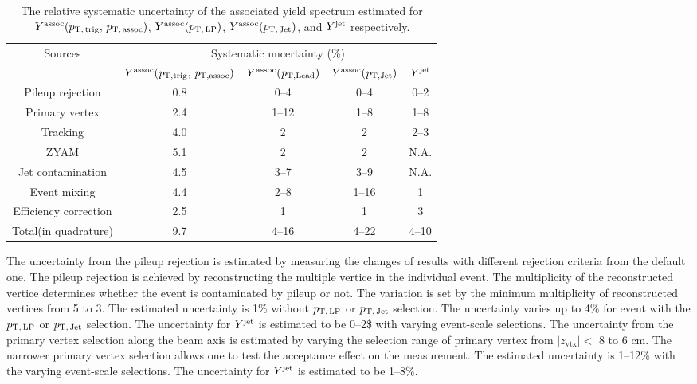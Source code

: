 \begin{table}[h!]
\caption{The relative systematic uncertainty of the associated yield spectrum estimated for $Y^{\rm{assoc}}(p_\mathrm{T,\,trig},\,p_\mathrm{T,\,assoc})$, $Y^{\rm{assoc}}(p_\mathrm{T,\,LP})$, $Y^{\rm{assoc}}(p_\mathrm{T,\,Jet})$, and $Y^{\rm{jet}}$ respectively.}
\centering
\begin{tabular}{|c|c|c|c|c|}
\hline 
\multirow{2}{*}{Sources}  & \multicolumn{4}{c|}{Systematic uncertainty (\%)} \\\cline{2-5} 
         & $Y^{\rm{assoc}}(\it{p}_{\rm{T, trig}},\,\it{p}_{\rm{T, assoc}})$ & $Y^{\rm{assoc}}(\it{p}_{\rm{T, Lead}})$ & $Y^{\rm{assoc}}(\it{p}_{\rm{T, Jet}})$ & $Y^{\rm{jet}}$ \\ \hline \hline
Pileup rejection		& 0.8	&0--4		&0--4	&0--2	\\ \hline
Primary vertex		& 2.4	&1--12	&1--8	&1--8	\\ \hline

Tracking			& 4.0 	&2		&2	&2--3	\\ \hline

ZYAM			& 5.1	&2		&2	&N.A.	\\ \hline
Jet contamination	& 4.5	&3--7		&3--9	&N.A.	\\ \hline

Event mixing			& 4.4	&2--8		&1--16	&1	\\ \hline

Efficiency correction	& 2.5 	&1		&1	&3	\\ \hline \hline
Total(in quadrature)			& 9.7	&4--16	&4--22	&4--10 \\ 
\hline 
\end{tabular}
\label{tab:syst}
\end{table}

The uncertainty from the pileup rejection is estimated by measuring the changes of results with different rejection criteria from the default one. The pileup rejection is achieved by reconstructing the multiple vertice in the individual event. The multiplicity of the reconstructed vertice determines whether the event is contaminated by pileup or not. The variation is set by the minimum multiplicity of reconstructed vertices from 5 to 3. The estimated uncertainty is 1\% without $p_\mathrm{T,\,LP}$ or $p_\mathrm{T,\,Jet}$ selection. The uncertainty varies up to 4\% for event with the $p_\mathrm{T,\,LP}$ or $p_\mathrm{T,\,Jet}$ selection. The uncertainty for $Y^{\rm{jet}}$ is estimated to be 0--2\$ with varying event-scale selections.
The uncertainty from the primary vertex selection along the beam axis is estimated by varying the selection range of primary vertex from $|z_\mathrm{vtx}|<$ 8 to 6 cm. The narrower primary vertex selection allows one to test the acceptance effect on the measurement. The estimated uncertainty is 1--12\% with the varying event-scale selections. The uncertainty for $Y^{\rm{jet}}$ is estimated to be 1--8\%.

